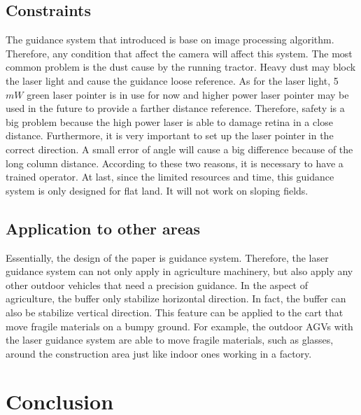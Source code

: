 \documentclass[12pt]{article}
\begin{document}
\begin{flushleft}
\subsection{Constraints}
The guidance system that introduced is base on image processing algorithm. Therefore, any condition that affect the camera will affect this system. The most common problem is the dust cause by the running tractor. Heavy dust may block the laser light and cause the guidance loose reference. As for the laser light, 5 $mW$ green laser pointer is in use for now and higher power laser pointer may be used in the future to provide a farther distance reference. Therefore, safety is a big problem because the high power laser is able to damage retina in a close distance. Furthermore, it is very important to set up the laser pointer in the correct direction. A small error of angle will cause a big difference because of the long column distance. According to these two reasons, it is necessary to have a trained operator. At last, since the limited resources and time, this guidance system is only designed for flat land. It will not work on sloping fields.


\subsection{Application to other areas}
Essentially, the design of the paper is guidance system. Therefore, the laser guidance system can not only apply in agriculture machinery, but also apply any other outdoor vehicles that need a precision guidance. In the aspect of agriculture, the buffer only stabilize horizontal direction. In fact, the buffer can also be stabilize vertical direction. This feature can be applied to the cart that move fragile materials on a bumpy ground. For example, the outdoor AGVs with the laser guidance system are able to move fragile materials, such as glasses, around the construction area just like indoor ones working in a factory. 

\section{Conclusion}


\end{flushleft}
\end{document}
